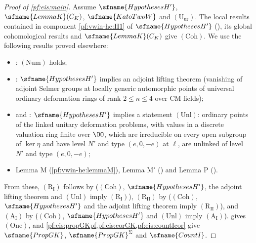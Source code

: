 \begin{proof}[Proof of \cref{pf:eis:main}]
Assume $\sfname{HypothesesH'}$, $\sfname{LemmaK}(C_K)$, $\sfname{KatoTwoW}$ and $(\mathrm{U}_{\mathrm{ur}})$. The local results contained in
component \ref{pf:vwin-he:H1} of $\sfname{HypothesesH'}$ (), its global cohomological
results and $\sfname{LemmaK}(C_K)$ give $(\mathrm{Coh})$. We use the following results proved elsewhere:
\begin{itemize}
\item {}: $(\mathrm{Num})$ holds;
\item {}: $\sfname{HypothesesH'}$ implies an
  adjoint lifting theorem (vanishing of adjoint Selmer groups at locally generic automorphic points of universal ordinary
  deformation rings of rank $2\le n\le4$ over CM fields);
\item {} and : $\sfname{HypothesesH'}$ implies a statement
  $(\mathrm{Unl})$: ordinary points of the linked unitary deformation problems, with values in a discrete valuation ring
  finite over $\OO$, which are irreducible on every open subgroup of $\ker\eta$ and have level $N'$ and type $(e,0,-e)$ at $\ell$,
  are unlinked of level $N'$ and type $(e,0,-e)$;
\item Lemma M (\cref{pf:vwin-he:lemmaM}), Lemma M$'$ () and Lemma P
  ().
\end{itemize}
From these, $(\mathrm{R}_{\mathrm{I}})$ follows by  ($(\mathrm{Coh})$, $\sfname{HypothesesH'}$, the
adjoint lifting theorem and $(\mathrm{Unl})$ imply $(\mathrm{R}_{\mathrm{I}})$), $(\mathrm{R}_{\mathrm{II}})$ by
 ($(\mathrm{Coh})$, $\sfname{HypothesesH'}$ and the adjoint lifting theorem imply
$(\mathrm{R}_{\mathrm{II}})$), and $(\mathrm{A}_{\mathrm{I}})$ by  ($(\mathrm{Coh})$,
$\sfname{HypothesesH'}$ and $(\mathrm{Unl})$ imply $(\mathrm{A}_{\mathrm{I}})$).  gives $(\mathrm{One})$, and
\cref{pf:eis:propGKpf,pf:eis:corGK,pf:eis:countIcor} give $\sfname{PropGK}$, $\sfname{PropGK}^{\Sigma}$ and $\sfname{CountI}$.
\end{proof}

